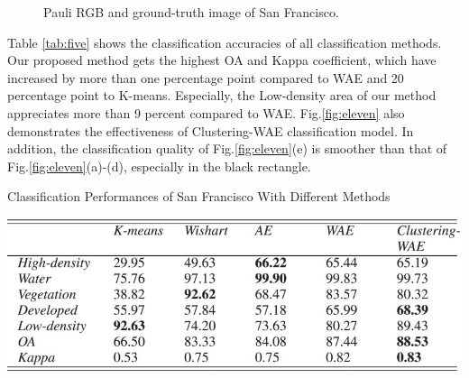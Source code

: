 \documentclass[11pt, a4paper, onecolumn, oneside]{article}
\begin{document}
\begin{figure}
\caption{Pauli RGB and ground-truth image of San Francisco.}
\label{fig:ten}
\end{figure}

Table \ref{tab:five} shows the classification accuracies of all classification methods. Our proposed method gets the highest OA and Kappa coefficient, which have increased by more than one percentage point compared to WAE and 20 percentage point to K-means. Especially, the Low-density area of our method appreciates more than 9 percent compared to WAE. Fig.\ref{fig:eleven} also demonstrates the effectiveness of Clustering-WAE classification model. In addition, the classification quality of Fig.\ref{fig:eleven}(e) is smoother than that of Fig.\ref{fig:eleven}(a)-(d), especially in the black rectangle.

\begin{table}
  \caption{ Classification Performances of San Francisco With Different Methods}
  \label{tab:five}
  \includegraphics[width=\linewidth]{table_5.jpg}
\end{table}
\end{document}
